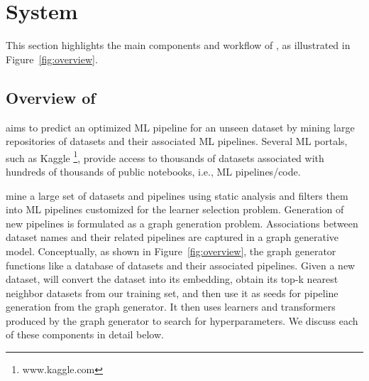 \section{{\sysname} System}
\label{overview}

This section highlights the main components and workflow of {\sysname}, as illustrated in Figure~\ref{fig:overview}. 

\subsection{Overview of {\sysname}}

{\sysname} aims to predict an optimized ML pipeline for an unseen dataset by mining large repositories of datasets and their associated ML pipelines. Several ML portals, such as Kaggle \footnote{www.kaggle.com}, provide access to thousands of datasets associated with hundreds of thousands of public notebooks, i.e., ML pipelines/code.

{\sysname} mine a large set of datasets and pipelines using static analysis and filters them into ML pipelines customized for the learner selection problem. Generation of new pipelines is formulated as a graph generation problem.  Associations between dataset names and their related pipelines are captured in a graph generative model.  Conceptually, as shown in Figure~\ref{fig:overview}, the graph generator functions like a database of datasets and their associated pipelines. Given a new dataset, {\sysname} will convert the dataset into its embedding, obtain its top-k nearest neighbor datasets from our training set, and then use it as seeds for pipeline generation from the graph generator. It then  uses learners and transformers produced by the graph generator to search for hyperparameters. We discuss each of these components in detail below.

